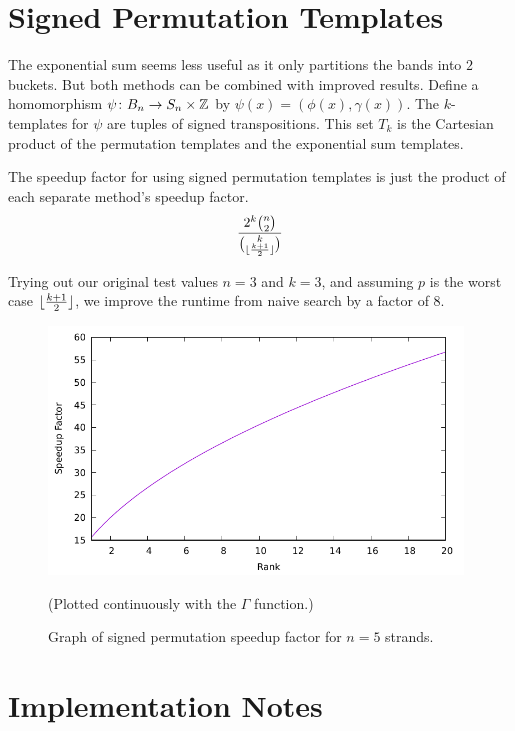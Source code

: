 \documentclass[12pt]{thesis}
\begin{document}
\section{Signed Permutation Templates}

The exponential sum seems less useful as it only
partitions the bands into $2$ buckets.
But both methods can be combined with improved results.
Define a homomorphism $\psi \colon B_{n} \rightarrow S_{n} \times \mathbb{Z}$
by $\psi(x) = (\phi(x), \gamma(x))$.
The $k$-templates for $\psi$ are tuples
of signed transpositions.
This set $T_{k}$ is the Cartesian product of the permutation
templates and the exponential sum templates.

\begin{proposition}
The speedup factor for using signed permutation templates is just the product of each
separate method's speedup factor.
\[
    \frac{2^{k} {n \choose 2}}{ { k \choose \lfloor \frac{k + 1}{2} \rfloor}}
\]
\end{proposition}

Trying out our original test values $n = 3$ and $k = 3$,
and assuming $p$ is the worst case $\lfloor \frac{k + 1}{2} \rfloor$, we improve
the runtime from naive search by a factor of $8$.

\begin{figure}[h]
    \centering
    \includegraphics[width=11cm]{combined-speedup.pdf}

    \caption{Graph of signed permutation speedup factor for $n = 5$ strands.}
    \label{fig:combined-speedup}

    (Plotted continuously with the $\Gamma$ function.)
\end{figure}

\section{Implementation Notes}
\end{document}

